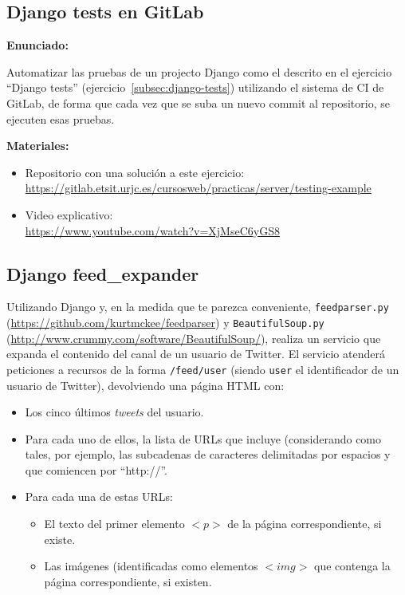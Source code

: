 \subsection{Django tests en GitLab}
\label{subsec:django-tests-gitlab}

\textbf{Enunciado:}

Automatizar las pruebas de un projecto Django como el descrito en el ejercicio ``Django tests'' (ejercicio~\ref{subsec:django-tests}) utilizando el sistema de CI de GitLab, de forma que cada vez que se suba un nuevo commit al repositorio, se ejecuten esas pruebas.


\textbf{Materiales:}

\begin{itemize}
\item Repositorio con una solución a este ejercicio: \\
  \url{https://gitlab.etsit.urjc.es/cursosweb/practicas/server/testing-example}
\item Video explicativo: \\
  \url{https://www.youtube.com/watch?v=XjMseC6yGS8}
\end{itemize}


\subsection{Django feed\_expander}
\label{subsec:django-feed-expander}

Utilizando Django y, en la medida que te parezca conveniente, \texttt{feedparser.py} (\url{https://github.com/kurtmckee/feedparser}) y \texttt{BeautifulSoup.py} (\url{http://www.crummy.com/software/BeautifulSoup/}), realiza un servicio que expanda el contenido del canal de un usuario de Twitter. El servicio atenderá peticiones a recursos de la forma \verb|/feed/user| (siendo  \texttt{user} el identificador de un usuario de Twitter), devolviendo una página HTML con:

\begin{itemize}
\item Los cinco últimos \emph{tweets} del usuario.
\item Para cada uno de ellos, la lista de URLs que incluye (considerando como tales, por ejemplo, las subcadenas de caracteres delimitadas por espacios y que comiencen por ``http://''.
\item Para cada una de estas URLs:
  \begin{itemize}
  \item El texto del primer elemento $<p>$ de la página correspondiente, si existe.
  \item Las imágenes (identificadas como elementos $<img>$ que contenga la página correspondiente, si existen.
  \end{itemize}
\end{itemize}


